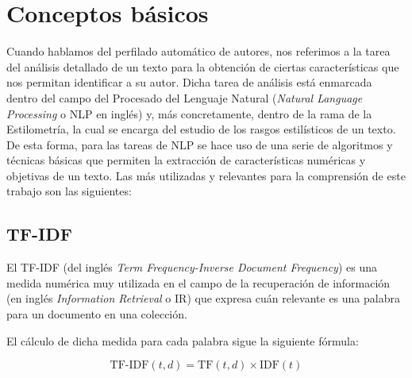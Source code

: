 \section{Conceptos básicos}

Cuando hablamos del perfilado automático de autores, nos referimos a la tarea del análisis detallado de un texto para la obtención de ciertas características
que nos permitan identificar a su autor.
Dicha tarea de análisis está enmarcada dentro del campo del Procesado del Lenguaje Natural (\textit{Natural Language Processing} o NLP en inglés) y, más concretamente,
dentro de la rama de la Estilometría, la cual se encarga del estudio de los rasgos estilísticos de un texto. De esta forma, para las tareas de NLP se hace uso
de una serie de algoritmos y técnicas básicas que permiten la extracción de características numéricas y objetivas de un texto. Las más utilizadas y relevantes
para la comprensión de este trabajo son las siguientes:

\subsection{TF-IDF}
El TF-IDF (del inglés \textit{Term Frequency-Inverse Document Frequency}) es una medida numérica muy utilizada en el campo de la recuperación de información 
(en inglés \textit{Information Retrieval} o IR) que expresa cuán relevante es una palabra para un documento en una colección.

\bigskip
El cálculo de dicha medida para cada palabra sigue la siguiente fórmula:

\begin{equation}
		\label{eq:tfidf}
		\text{TF-IDF}(t,d) = \text{TF}(t,d) \times \text{IDF}(t)
\end{equation}

